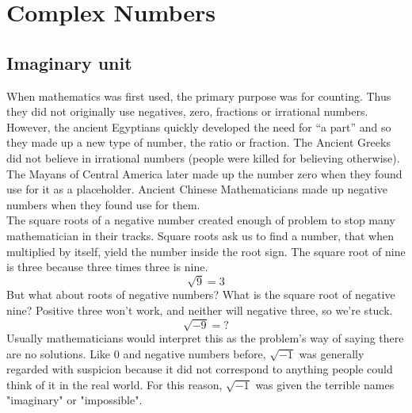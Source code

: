 \chapter{Complex Numbers}
%
\section{Imaginary unit}
When mathematics was first used, the primary purpose was
for counting. Thus they did not originally use negatives, zero, fractions or irrational
numbers. However, the ancient Egyptians quickly developed the need for “a
part” and so they made up a new type of number, the ratio or fraction. The
Ancient Greeks did not believe in irrational numbers (people were killed for
believing otherwise). The Mayans of Central America later made up the number
zero when they found use for it as a placeholder. Ancient Chinese Mathematicians
made up negative numbers when they found use for them. \\
The square roots of a negative number created enough
of problem to stop many mathematician in their tracks. Square roots ask
us to find a number, that when multiplied by itself, yield
the number inside the root sign. The square root of nine is
three because three times three is nine.
\[ \sqrt{9}=3 \]
But what about roots of negative numbers? What is the
square root of negative nine? Positive three won’t work,
and neither will negative three, so we’re stuck. 
\[
    \sqrt{-9}=? 
\]
Usually mathematicians would interpret this as the problem’s way of saying there
are no solutions. Like 0 and negative numbers before, $\sqrt{-1}$ was generally regarded 
with suspicion because it did not correspond to anything people could think of it in the real
world. For this reason, $\sqrt{-1}$ was given the terrible names "imaginary" or "impossible".

